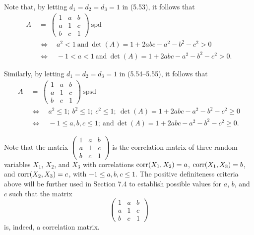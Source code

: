 Note that, by letting $d_1 = d_2 = d_3 = 1$ in (5.53), it follows that
\begin{equation}
\begin{split}
A \;&=\; \begin{pmatrix} 1 & a & b\\ a & 1 & c\\ b & c & 1 \end{pmatrix} \ \text{spd}\\
&\Longleftrightarrow \quad a^2 < 1 \ \text{and} \ \det(A) = 1+2abc-a^2-b^2-c^2 > 0\\
&\Longleftrightarrow \quad -1 < a < 1 \ \text{and} \ \det(A) = 1+2abc-a^2-b^2-c^2 > 0.
\end{split}
\end{equation}

Similarly, by letting $d_1 = d_2 = d_3 = 1$ in (5.54--5.55), it follows that
\begin{equation}
\begin{split}
A \;&=\; \begin{pmatrix} 1 & a & b\\ a & 1 & c\\ b & c & 1 \end{pmatrix} \ \text{spsd}\\
&\Longleftrightarrow \quad a^2 \leq 1;\ b^2 \leq 1;\ c^2 \leq 1;\ \det(A) = 1+2abc-a^2-b^2-c^2 \geq 0\\
&\Longleftrightarrow \quad -1 \leq a,b,c \leq 1; \ \text{and} \ \det(A) = 1+2abc-a^2-b^2-c^2 \geq 0.
\end{split}
\end{equation}

Note that the matrix $\begin{pmatrix} 1 & a & b\\ a & 1 & c\\ b & c & 1 \end{pmatrix}$ is
the correlation matrix of three random variables $X_1$, $X_2$, and $X_3$ with
correlations $\operatorname{corr}(X_1,X_2) = a$, $\operatorname{corr}(X_1,X_3) = b$, and $\operatorname{corr}(X_2,X_3) = c$, with
$-1 \leq a,b,c \leq 1$. The positive definiteness criteria above will be further used
in Section 7.4 to establish possible values for $a$, $b$, and $c$ such that the matrix
\[
\begin{pmatrix} 1 & a & b\\ a & 1 & c\\ b & c & 1 \end{pmatrix}
\]
is, indeed, a correlation matrix.

